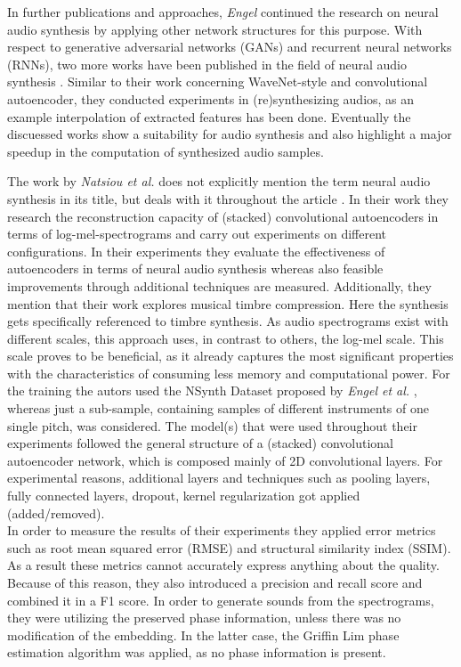 In further publications and approaches, \textit{Engel} continued the research on neural audio synthesis by applying other network structures for this purpose. With respect to generative adversarial networks (GANs) and recurrent neural networks (RNNs), two more works have been published in the field of neural audio synthesis \cite{Engel2019, hantrakul2019fast}. Similar to their work concerning WaveNet-style and convolutional autoencoder, they conducted experiments in (re)synthesizing audios, as an example interpolation of extracted features has been done. Eventually the discuessed works show a suitability for audio synthesis and also highlight a major speedup in the computation of synthesized audio samples.

The work by \textit{Natsiou et al.} does not explicitly mention the term neural audio synthesis in its title, but deals with it throughout the article \cite{Natsiou2023}. In their work they research the reconstruction capacity of (stacked) convolutional autoencoders in terms of log-mel-spectrograms and carry out experiments on different configurations. In their experiments they evaluate the effectiveness of autoencoders in terms of neural audio synthesis whereas also feasible improvements through additional techniques are measured. Additionally, they mention that their work explores musical timbre compression. Here the synthesis gets specifically referenced to timbre synthesis. As audio spectrograms exist with different scales, this approach uses, in contrast to others, the log-mel scale. This scale proves to be beneficial, as it already captures the most significant properties with the characteristics of consuming less memory and computational power. For the training the autors used the NSynth Dataset proposed by \textit{Engel et al. } \cite{Engel2017}, whereas just a sub-sample, containing samples of different instruments of one single pitch, was considered. The model(s) that were used throughout their experiments followed the general structure of a (stacked) convolutional autoencoder network, which is composed mainly of 2D convolutional layers. For experimental reasons, additional layers and techniques such as pooling layers, fully connected layers, dropout, kernel regularization got applied (added/removed).\\
In order to measure the results of their experiments they applied error metrics such as root mean squared error (RMSE) and structural similarity index (SSIM). As a result these metrics cannot accurately express anything about the quality. Because of this reason, they also introduced a precision and recall score and combined it in a F1 score. In order to generate sounds from the spectrograms, they were utilizing the preserved phase information, unless there was no modification of the embedding. In the latter case, the Griffin Lim phase estimation algorithm was applied, as no phase information is present.\\
